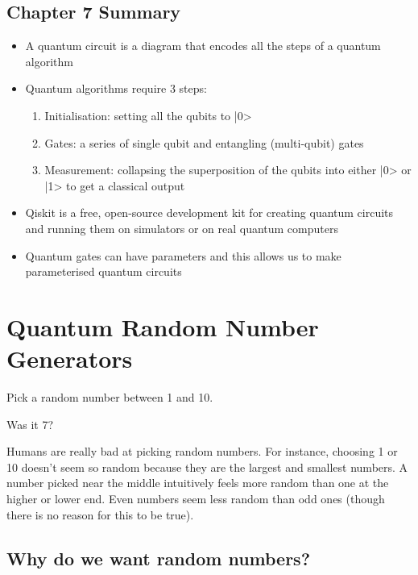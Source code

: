 \documentclass{book}
\begin{document}
\section{Chapter 7 Summary}

\begin{itemize}
\item A quantum circuit is a diagram that encodes all the steps of a quantum algorithm
\item Quantum algorithms require 3 steps:
\begin{enumerate}
    \item Initialisation: setting all the qubits to |0>
    \item Gates: a series of single qubit and entangling (multi-qubit) gates
    \item Measurement: collapsing the superposition of the qubits into either |0> or |1> to get a classical output 
\end{enumerate}
\item Qiskit is a free, open-source development kit for creating quantum circuits and running them on simulators or on real quantum computers
\item Quantum gates can have parameters and this allows us to make parameterised quantum circuits 

\end{itemize}
\chapter{Quantum Random Number Generators}


Pick a random number between 1 and 10. 

Was it 7?    

Humans are really bad at picking random numbers. For instance, choosing 1 or 10 doesn’t seem so random because they are the largest and smallest numbers. A number picked near the middle intuitively feels more random than one at the higher or lower end. Even numbers seem less random than odd ones (though there is no reason for this to be true). 


\section{Why do we want random numbers?}
\end{document}
